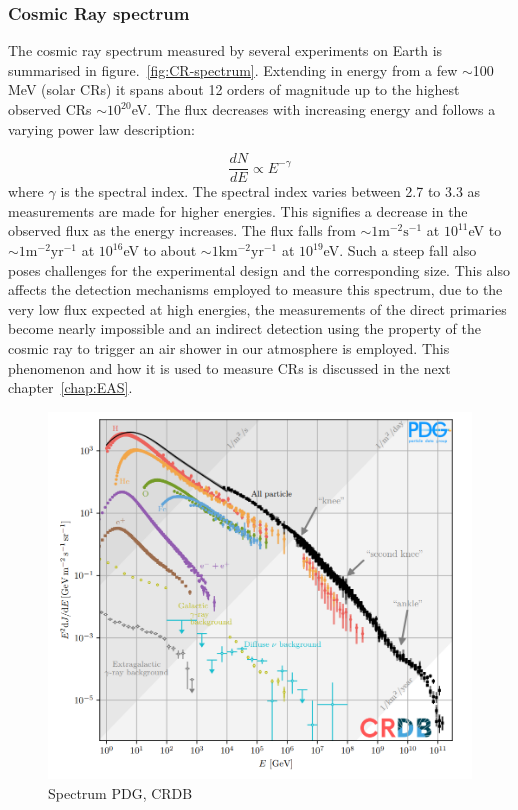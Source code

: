 \subsubsection*{Cosmic Ray spectrum}
\label{subsubsec:CRspectrum}
The cosmic ray spectrum measured by several experiments on Earth is summarised in figure.~\ref{fig:CR-spectrum}. Extending in energy from a few $\sim$100 MeV (solar CRs) it spans about 12 orders of magnitude up to the highest observed CRs $\sim 10^{20}$eV. The flux decreases with increasing energy and follows a varying power law description:

\begin{equation}
  \label{eq:Powlaw}
  \frac{dN}{dE} \propto E^{-\gamma}   
\end{equation}
where $\gamma$ is the spectral index. The spectral index varies between 2.7 to 3.3 as measurements are made for higher energies. This signifies a decrease in the observed flux as the energy increases. The flux falls from $\mathrm{\sim 1m^{-2} s^{-1}}$ at $10^{11}$eV to $\mathrm{\sim 1m^{-2} yr^{-1}}$ at $10^{16}$eV to about $\mathrm{\sim 1km^{-2} yr^{-1}}$ at $10^{19}$eV. Such a steep fall also poses challenges for the experimental design and the corresponding size. This also affects the detection mechanisms employed to measure this spectrum, due to the very low flux expected at high energies, the measurements of the direct primaries become nearly impossible and an indirect detection using the property of the cosmic ray to trigger an air shower in our atmosphere is employed. This phenomenon and how it is used to measure CRs is discussed in the next chapter~\ref{chap:EAS}.

\begin{figure}[t!]
  \centering
  \includegraphics[width=14.5cm]{thesis_figures/CRnNu/CR-spectrum.png}
  \caption{Spectrum PDG, CRDB~\cite{ParticleDataGroup:2024cfk}}
  \label{fig:CR-spectrum_scaled}
\end{figure}


